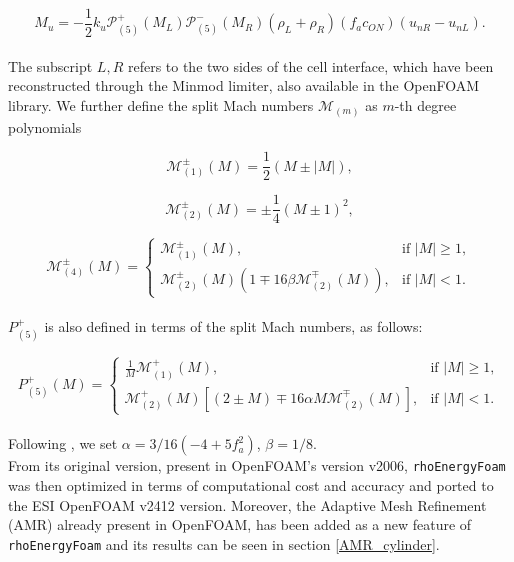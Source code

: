 \documentclass[a5paper]{sapthesis}
\begin{document}
	\begin{equation}
		M_u = -\frac{1}{2} k_u \mathcal{P}_{(5)}^+ (M_L) \mathcal{P}_{(5)}^- (M_R) (\rho_L + \rho_R) (f_a c_{ON}) (u_{nR} - u_{nL}).
	\end{equation}
	\\
	The subscript $L, R$ refers to the two sides of the cell interface, which have been reconstructed through the Minmod limiter, also available in the OpenFOAM library. We further define the split Mach numbers $\mathcal{M}_{(m)}$ as $m$-th degree polynomials
	
	\begin{equation}
		\mathcal{M}_{(1)}^{\pm} (M) = \frac{1}{2} (M \pm |M|),
	\end{equation}
	
	\begin{equation}
		\mathcal{M}_{(2)}^{\pm} (M) = \pm \frac{1}{4} (M \pm 1)^2,
	\end{equation}
	
	\begin{equation}
		\mathcal{M}_{(4)}^{\pm} (M) =
		\begin{cases}
			\mathcal{M}_{(1)}^{\pm} (M), & \text{if } |M| \geq 1, \\
			\mathcal{M}_{(2)}^{\pm} (M) (1 \mp 16 \beta \mathcal{M}_{(2)}^{\mp} (M)), & \text{if } |M| < 1.
		\end{cases}
	\end{equation}
	\\
	$P_{(5)}^+$ is also defined in terms of the split Mach numbers, as follows:
	
	\begin{equation}
		P_{(5)}^+ (M) =
		\begin{cases}
			\frac{1}{M} \mathcal{M}_{(1)}^{+} (M), & \text{if } |M| \geq 1, \\
			\mathcal{M}_{(2)}^{+} (M) [(2 \pm M) \mp 16 \alpha M \mathcal{M}_{(2)}^{\mp} (M)], & \text{if } |M| < 1.
		\end{cases}
	\end{equation}
	\\
	Following \citet{LIOU_AUSM+-up}, we set $\alpha = 3/16(-4 + 5 f_a^2)$, $\beta = 1/8$.
	\\
	From its original version, present in OpenFOAM's version v2006, \texttt{rhoEnergyFoam} was then optimized in terms of computational cost and	accuracy and ported to the ESI OpenFOAM v2412 version. Moreover, the Adaptive Mesh Refinement (AMR) already present in OpenFOAM, has been added as a new feature of \texttt{rhoEnergyFoam} and its results can be seen in section \ref{AMR_cylinder}.
	 
\end{document}
